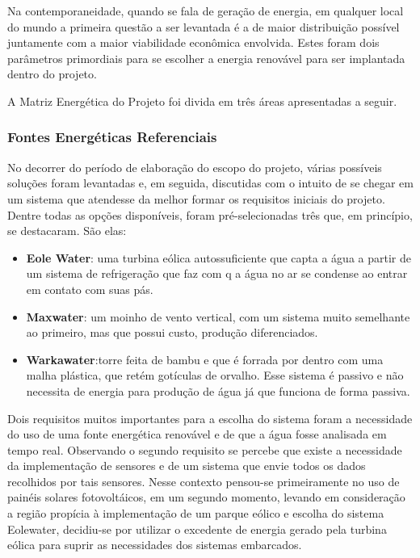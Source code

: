 Na contemporaneidade, quando se fala de geração de energia, em qualquer local do mundo a primeira questão a ser levantada
é a de maior distribuição possível juntamente com a maior viabilidade econômica envolvida. Estes foram dois parâmetros 
primordiais para se escolher a energia renovável para ser implantada dentro do projeto.

A Matriz Energética do Projeto foi divida em três áreas apresentadas a seguir.

  \subsubsection{Fontes Energéticas Referenciais}
    
    No decorrer do período de elaboração do escopo do projeto, várias possíveis soluções foram levantadas e, em seguida, 
    discutidas com o intuito de se chegar em um sistema que atendesse da melhor formar os requisitos iniciais do projeto.
    Dentre todas as opções disponíveis, foram pré-selecionadas três que, em princípio, se destacaram. São elas:
    
    \begin{itemize}
      \item \textbf{Eole Water}: uma turbina eólica autossuficiente que capta a água a partir de um sistema de refrigeração
	que faz com q a água no ar se condense ao entrar em contato com suas pás.
     
      \item \textbf{Maxwater}: um moinho de vento vertical, com um sistema muito semelhante ao primeiro, mas que possui custo,
	produção diferenciados.
      
      \item \textbf{Warkawater}:torre feita de bambu e que é forrada por dentro com uma malha plástica, que retém gotículas
	de orvalho. Esse sistema é passivo e não necessita de energia para produção de água já que funciona de forma passiva.
    \end{itemize}
  
    Dois requisitos muitos importantes para a escolha do sistema foram a necessidade do uso de uma fonte energética renovável
    e de que a água fosse analisada em tempo real. Observando o segundo requisito se percebe que existe a necessidade da
    implementação de sensores e de um sistema que envie todos os dados recolhidos por tais sensores. Nesse contexto pensou-se 
    primeiramente no uso de painéis solares fotovoltáicos, em um segundo momento, levando em consideração a região propícia à 
    implementação de um parque eólico e escolha do sistema Eolewater, decidiu-se por utilizar o excedente de energia gerado 
    pela turbina eólica para suprir as necessidades dos sistemas embarcados.
  
